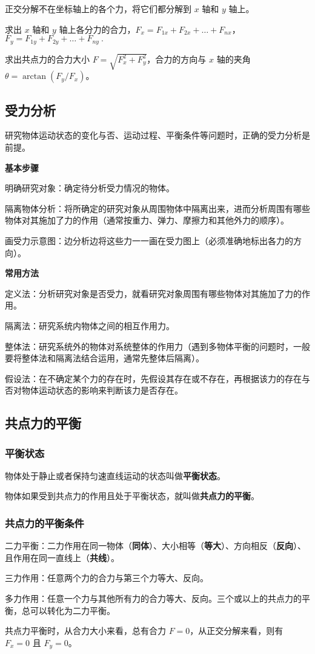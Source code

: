 正交分解不在坐标轴上的各个力，将它们都分解到 $x$ 轴和 $y$ 轴上。

求出 $x$ 轴和 $y$ 轴上各分力的合力，$F_{x}=F_{{1x}}+F_{{2x}}+\dots+F_{{nx}}$，$F_{y}=F_{{1y}}+F_{{2y}}+\dots+F_{{ny}}~.$

求出共点力的合力大小 $F=\sqrt{F_x^2+F_y^2}$，合力的方向与 $x$ 轴的夹角 $\theta=\arctan(F_y/F_x)$。

\subsection{受力分析}
研究物体运动状态的变化与否、运动过程、平衡条件等问题时，正确的受力分析是前提。

\textbf{基本步骤}

明确研究对象：确定待分析受力情况的物体。

隔离物体分析：将所确定的研究对象从周围物体中隔离出来，进而分析周围有哪些物体对其施加了力的作用（通常按重力、弹力、摩擦力和其他外力的顺序）。

画受力示意图：边分析边将这些力一一画在受力图上（必须准确地标出各力的方向）。

\textbf{常用方法}

定义法：分析研究对象是否受力，就看研究对象周围有哪些物体对其施加了力的作用。

隔离法：研究系统内物体之间的相互作用力。

整体法：研究系统外的物体对系统整体的作用力（遇到多物体平衡的问题时，一般要将整体法和隔离法结合运用，通常先整体后隔离）。

假设法：在不确定某个力的存在时，先假设其存在或不存在，再根据该力的存在与否对物体运动状态的影响来判断该力是否存在。

\subsection{共点力的平衡}
\subsubsection{平衡状态}
物体处于静止或者保持匀速直线运动的状态叫做\textbf{平衡状态}。

物体如果受到共点力的作用且处于平衡状态，就叫做\textbf{共点力的平衡}。

\subsubsection{共点力的平衡条件}
二力平衡：二力作用在同一物体（\textbf{同体}）、大小相等（\textbf{等大}）、方向相反（\textbf{反向}）、且作用在同一直线上（\textbf{共线}）。

三力作用：任意两个力的合力与第三个力等大、反向。

多力作用：任意一个力与其他所有力的合力等大、反向。三个或以上的共点力的平衡，总可以转化为二力平衡。

共点力平衡时，从合力大小来看，总有合力 $F=0$，从正交分解来看，则有 $F_x=0$ 且 $F_y=0$。

